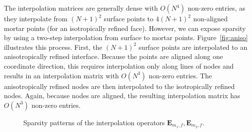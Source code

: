 \documentclass{svjour3}                     %
\begin{document}
The interpolation matrices are generally dense with $O(N^4)$ non-zero entries, as they interpolate from $(N+1)^2$ surface points to $4(N+1)^2$ non-aligned mortar points (for an isotropically refined face).  However, we can expose sparsity by using a two-step interpolation from surface to mortar points.  Figure~\ref{fig:aniso} illustrates this process.  First, the $(N+1)^2$ surface points are interpolated to an anisotropically refined interface.  Because the points are aligned along one coordinate direction, this requires interpolation only along lines of nodes and results in an interpolation matrix with $O(N^3)$ non-zero entries.  The anisotropically refined nodes are then interpolated to the isotropically refined nodes.  Again, because nodes are aligned, the resulting interpolation matrix has $O(N^3)$ non-zero entries.  

\begin{figure}[!h]
\centering
{}
\hspace{4em}
\caption{Sparsity patterns of the interpolation operators $\bm{E}_{m_1,f}, \bm{E}_{m_2,f}$.}
\label{fig:anisointerp}
\end{figure}
\end{document}
